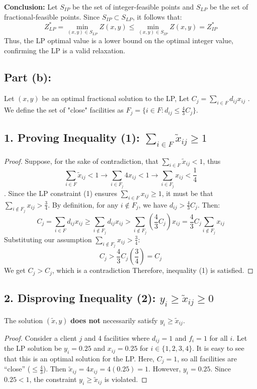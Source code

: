 \textbf{Conclusion:}
Let $S_{IP}$ be the set of integer-feasible points and $S_{LP}$ be the set of fractional-feasible points. Since $S_{IP} \subset S_{LP}$, it follows that:
\[ Z_{LP}^* = \min_{(x,y) \in S_{LP}} Z(x,y) \le \min_{(x,y) \in S_{IP}} Z(x,y) = Z_{IP}^* \]
Thus, the LP optimal value is a lower bound on the optimal integer value, confirming the LP is a valid relaxation.



\subsection*{Part (b):}

Let $(x, y)$ be an optimal fractional solution to the LP, Let $C_j = \sum_{i \in F} d_{ij} x_{ij}$ . We define the set of "close" facilities as $F_j = \{ i \in F : d_{ij} \le \frac{4}{3} C_j \}$.

\subsection*{1. Proving Inequality (1): $\sum_{i \in F} \tilde{x}_{ij} \ge 1$}
\begin{proof}
Suppose, for the sake of contradiction, that $\sum_{i \in F} \tilde{x}_{ij} < 1$, thus \[ \sum_{i \in F} \tilde{x}_{ij} < 1 \rightarrow \sum_{i \in F_j} 4x_{ij} < 1 \rightarrow  \sum_{i \in F_j} x_{ij} < \frac{1}{4}\]. 
Since the LP constraint (1) ensures $\sum_{i \in F} x_{ij} \ge 1$, it must be that $\sum_{i \notin F_j} x_{ij} > \frac{3}{4}$. 
By definition, for any $i \notin F_j$, we have $d_{ij} > \frac{4}{3} C_j$. Then:
\[
C_j = \sum_{i \in F} d_{ij} x_{ij} \ge \sum_{i \notin F_j} d_{ij} x_{ij} > \sum_{i \notin F_j} \left( \frac{4}{3} C_j \right) x_{ij} = \frac{4}{3} C_j \sum_{i \notin F_j} x_{ij}
\]
Substituting our assumption $\sum_{i \notin F_j} x_{ij} > \frac{3}{4}$:
\[
C_j > \frac{4}{3} C_j \left( \frac{3}{4} \right) = C_j
\]
We get $C_j > C_j$, which is a contradiction Therefore, inequality (1) is satisfied.
\end{proof}

\subsection*{2. Disproving Inequality (2): $y_i \ge \tilde{x}_{ij} \ge 0$}

The solution $(\tilde{x}, y)$ \textbf{does not} necessarily satisfy $y_i \ge \tilde{x}_{ij}$.
\begin{proof}
Consider a client $j$ and 4 facilities where $d_{ij} = 1$ and $f_i = 1$ for all $i$. Let the LP solution be $y_i = 0.25$ and $x_{ij} = 0.25$ for $i \in \{1, 2, 3, 4\}$. It is easy to see that this is an optimal solution for the LP.
Here, $C_j = 1$, so all facilities are ``close'' ($\le \frac{4}{3}$). 
Then $\tilde{x}_{ij} = 4 x_{ij} = 4(0.25) = 1$.
However, $y_i = 0.25$. Since $0.25 < 1$, the constraint $y_i \ge \tilde{x}_{ij}$ is violated.
\end{proof}


